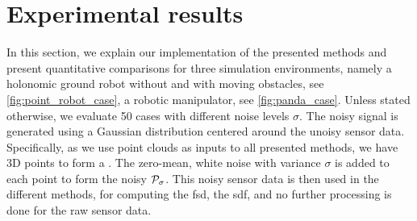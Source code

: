 \section{Experimental results}
\label{sec:results}

In this section, we explain our implementation of the
presented methods and present quantitative
comparisons for three simulation environments, namely a
holonomic ground robot without and with moving obstacles,
see \cref{fig:point_robot_case}, a robotic manipulator, see
\cref{fig:panda_case}.
Unless stated otherwise, we evaluate 50 cases with different
noise levels $\sigma$. The noisy signal is generated using a
Gaussian distribution centered around the unoisy sensor
data. Specifically, as we use point clouds as inputs to all
presented methods, we have \np{} 3D points to form a
\pointcloud{}. The zero-mean, white noise with variance
$\sigma$ is added to each point to form the noisy
$\mathcal{P}_{\sigma}$. This noisy sensor data is then used
in the different methods, for computing the \ac{fsd}, the
\ac{sdf}, and no further processing is done for the raw
sensor data.

